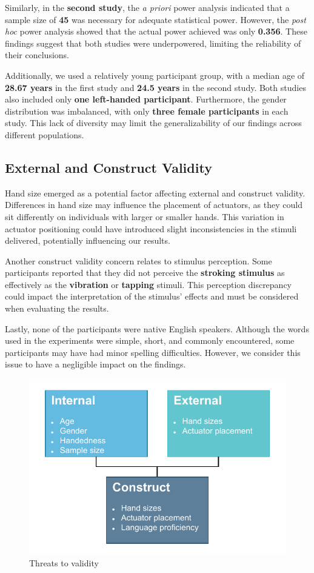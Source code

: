 Similarly, in the \textbf{second study}, the \textit{a priori} power analysis indicated that a sample size of \textbf{45} was necessary for adequate statistical power. However, the \textit{post hoc} power analysis showed that the actual power achieved was only \textbf{0.356}. These findings suggest that both studies were underpowered, limiting the reliability of their conclusions.

Additionally, we used a relatively young participant group, with a median age of \textbf{28.67 years} in the first study and \textbf{24.5 years} in the second study. Both studies also included only \textbf{one left-handed participant}. Furthermore, the gender distribution was imbalanced, with only \textbf{three female participants} in each study. This lack of diversity may limit the generalizability of our findings across different populations.

\subsection{External and Construct Validity}
Hand size emerged as a potential factor affecting external and construct validity. Differences in hand size may influence the placement of actuators, as they could sit differently on individuals with larger or smaller hands. This variation in actuator positioning could have introduced slight inconsistencies in the stimuli delivered, potentially influencing our results.

Another construct validity concern relates to stimulus perception. Some participants reported that they did not perceive the \textbf{stroking stimulus} as effectively as the \textbf{vibration} or \textbf{tapping} stimuli. This perception discrepancy could impact the interpretation of the stimulus' effects and must be considered when evaluating the results.

Lastly, none of the participants were native English speakers. Although the words used in the experiments were simple, short, and commonly encountered, some participants may have had minor spelling difficulties. However, we consider this issue to have a negligible impact on the findings.

\begin{figure}
    \centering
    \includegraphics[width=0.5\linewidth]{src/pictures/StudyData/Threats_to_validity.drawio.pdf}
    \caption{Threats to validity}
    \label{fig:threats_to_validity}
\end{figure}




